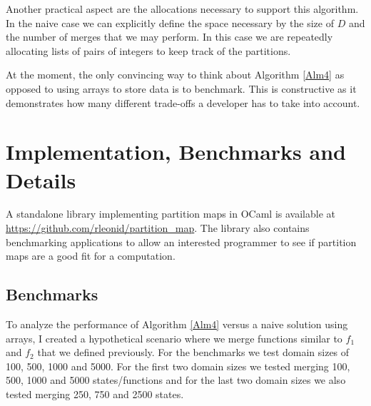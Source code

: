 \documentclass{article}
\begin{document}
Another practical aspect are the allocations necessary to support this
algorithm.
In the naive case we can explicitly define the space necessary by the size
of $D$ and the number of merges that we may perform.
In this case we are repeatedly allocating lists of pairs of integers to keep
track of the partitions.

At the moment, the only convincing way to think about Algorithm \ref{Alm4} as
opposed to using arrays to store data is to benchmark.
This is constructive as it demonstrates how many different trade-offs a
developer has to take into account.


\section{Implementation, Benchmarks and Details}

A standalone library implementing partition maps in OCaml\cite{ocaml-manual}
is available at \url{https://github.com/rleonid/partition_map}.
The library also contains benchmarking applications to allow an interested
programmer to see if partition maps are a good fit for a computation.

\subsection{Benchmarks}

To analyze the performance of Algorithm \ref{Alm4} versus a naive solution
using arrays,
I created a hypothetical scenario where we merge functions
similar to $f_{1}$ and $f_{2}$ that we defined previously.
For the benchmarks we test domain sizes of 100, 500, 1000 and 5000.
For the first two domain sizes we tested merging 100, 500, 1000 and 5000
states/functions and for the last two domain sizes we also tested merging
250, 750 and 2500 states.
\end{document}
